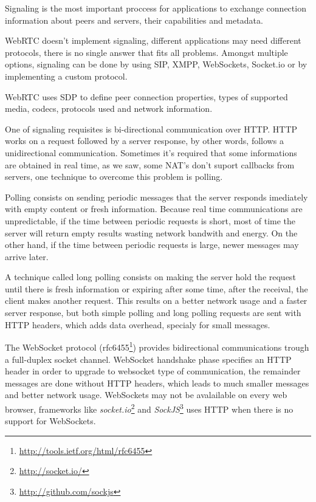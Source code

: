 Signaling is the most important proccess for applications to exchange connection information about peers and servers, their capabilities and metadata.

  \ac{WebRTC} doesn't implement signaling, different applications may need different protocols, there is no single answer that fits all problems. Amongst multiple options, signaling can be done by using \ac{SIP}, \ac{XMPP}, WebSockets, Socket.io or by implementing a custom protocol.

  \ac{WebRTC} uses \ac{SDP} to define peer connection properties, types of supported media, codecs, protocols used and network information.

  One of signaling requisites is bi-directional communication over \ac{HTTP}. \ac{HTTP} works on a request followed by a server response, by other words, follows a unidirectional communication. Sometimes it's required that some informations are obtained in real time, as we saw, some \ac{NAT}'s don't suport callbacks from servers, one technique to overcome this problem is polling.

  Polling consists on sending periodic messages that the server responds imediately with empty content or fresh information. Because real time communications are unpredictable, if the time between periodic requests is short, most of time the server will return empty results wasting network bandwith and energy. On the other hand, if the time between periodic requests is large, newer messages may arrive later.

  A technique called long polling consists on making the server hold the request until there is fresh information or expiring after some time, after the receival, the client makes another request. This results on a better network usage and a faster server response, but both simple polling and long polling requests are sent with \ac{HTTP} headers, which adds data overhead, specialy for small messages.

  The WebSocket protocol (rfc6455\footnote{\url{http://tools.ietf.org/html/rfc6455}}) provides bidirectional communications trough a full-duplex socket channel. WebSocket handshake phase specifies an \ac{HTTP} header in order to upgrade to websocket type of communication, the remainder messages are done without \ac{HTTP} headers, which leads to much smaller messages and better network usage. WebSockets may not be avalailable on every web browser, frameworks like \textit{socket.io}\footnote{\url{http://socket.io/}} and \textit{SockJS}\footnote{\url{http://github.com/sockjs}} uses \ac{HTTP} when there is no support for WebSockets. 

